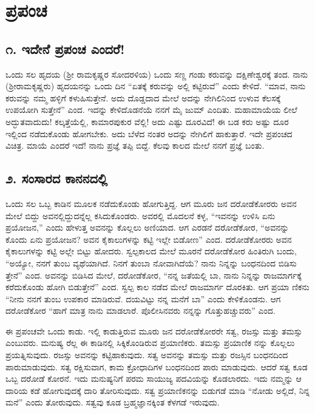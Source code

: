 
\chapter{ಪ್ರಪಂಚ}

\section{\num{೧.} ಇದೇನೆ ಪ್ರಪಂಚ ಎಂದರೆ!}

ಒಂದು ಸಲ ಹೃದಯ (ಶ್ರೀ ರಾಮಕೃಷ್ಣರ ಸೋದರಳಿಯ) ಒಂದು ಸಣ್ಣ ಗಂಡು ಕರುವನ್ನು ದಕ್ಷಿಣೇಶ್ವರಕ್ಕೆ ತಂದ. ನಾನು (ಶ್ರೀರಾಮಕೃಷ್ಣರು) ಹೃದಯನನ್ನು ಒಂದು ದಿನ “ಏತಕ್ಕೆ ಕರುವನ್ನು ಅಲ್ಲಿ ಕಟ್ಟಿರುವೆ” ಎಂದು ಕೇಳಿದೆ. “ಮಾವ, ನಾನು ಕರುವನ್ನು ನಮ್ಮ ಹಳ್ಳಿಗೆ ಕಳುಹಿಸುತ್ತೇನೆ. ಅದು ದೊಡ್ಡದಾದ ಮೇಲೆ ಅದನ್ನು ನೇಗಿಲಿನಿಂದ ಉಳುವ ಕೆಲಸಕ್ಕೆ ಉಪಯೋಗಿ ಸುತ್ತೇನೆ” ಎಂದ. ಇದನ್ನು ಕೇಳಿದೊಡನೆಯೆ ನನಗೆ ಮೈ ಜುಮ್ ಎಂದಿತು. ಮಹಾಮಾಯೆಯ ಲೀಲೆ ಅದ್ಭುತವಾದುದು! ಕಲ್ಕತ್ತೆಯೆಲ್ಲಿ, ಕಾಮಾರಪುಕುರ ವೆಲ್ಲಿ! ಅದು ಎಷ್ಟು ದೂರವಿದೆ! ಈ ಬಡ ಕರು ಅಷ್ಟು ದೂರ ಇಲ್ಲಿಂದ ನಡೆದುಕೊಂಡು ಹೋಗಬೇಕು. ಅದು ಬೆಳೆದ ನಂತರ ಅದನ್ನು ನೇಗಿಲಿಗೆ ಹಾಕುತ್ತಾರೆ. ಇದೇ ಪ್ರಪಂಚದ ವಿಚಿತ್ರ. ಮಾಯೆ ಎಂದರೆ ಇದೆ! ನಾನು ಪ್ರಜ್ಞೆ ತಪ್ಪಿ ಬಿದ್ದೆ. ಕೆಲವು ಕಾಲದ ಮೇಲೆ ನನಗೆ ಪ್ರಜ್ಞೆ ಬಂತು.


\section{\num{೨.} ಸಂಸಾರದ ಕಾನನದಲ್ಲಿ}

ಒಂದು ಸಲ ಒಬ್ಬ ಕಾಡಿನ ಮೂಲಕ ನಡೆದುಕೊಂಡು ಹೋಗುತ್ತಿದ್ದ. ಆಗ ಮೂರು ಜನ ದರೋಡೆಕೋರರು ಅವನ ಮೇಲೆ ಬಿದ್ದು ಅವನಲ್ಲಿದ್ದುದನ್ನೆಲ್ಲ ಕಸಿದುಕೊಂಡರು. ಅವರಲ್ಲಿ ಮೊದಲನೆ ಕಳ್ಳ, “ಇವನನ್ನು ಉಳಿಸಿ ಏನು ಪ್ರಯೋಜನ,” ಎಂದು ಹೇಳುತ್ತ ಅವನನ್ನು ಕೊಲ್ಲಲು ಅಣಿಯಾದ. ಆಗ ಎರಡನೆ ದರೋಡೆಕೋರ, “ಅವನನ್ನು ಕೊಂದು ಏನು ಪ್ರಯೋಜನ? ಅವನ ಕೈಕಾಲುಗಳನ್ನು ಕಟ್ಟಿ ಇಲ್ಲೇ ಬಿಡೋಣ” ಎಂದ. ದರೋಡೆಕೋರರು ಅವನ ಕೈಕಾಲುಗಳನ್ನು ಕಟ್ಟಿ ಅಲ್ಲೇ ಬಿಟ್ಟು ಹೋದರು. ಸ್ವಲ್ಪಕಾಲದ ಮೇಲೆ ಮೂರನೆ ದರೋಡೆಕೋರ ಹಿಂತಿರುಗಿ ಬಂದು, “ಅಯ್ಯೋ, ನನಗೆ ತುಂಬ ವ್ಯಥೆಯಾಗಿದೆ. ನಿನಗೆ ತುಂಬಾ ನೋವಾಗಿದೆಯೆ? ನಾನು ನಿನ್ನನ್ನು ಬಂಧನದಿಂದ ಬಿಡಿಸು ತ್ತೇನೆ” ಎಂದ. ಅವನನ್ನು ಬಿಡಿಸಿದ ಮೇಲೆ, ದರೋಡೆಕೋರ, “ನನ್ನ ಜತೆಯಲ್ಲಿ ಬಾ, ನಾನು ನಿನ್ನನ್ನು ರಾಜಮಾರ್ಗಕ್ಕೆ ಕರೆದುಕೊಂಡು ಹೋಗಿ ಬಿಡುತ್ತೇನೆ” ಎಂದ. ಸ್ವಲ್ಪ ಕಾಲ ನಡೆದ ಮೇಲೆ ರಾಜಮಾರ್ಗ ದೊರಕಿತು. ಆಗ ಪ್ರಯಾ ಣಿಕನು “ನೀನು ನನಗೆ ತುಂಬ ಉಪಕಾರ ಮಾಡಿರುವೆ. ದಯವಿಟ್ಟು ನನ್ನ ಮನೆಗೆ ಬಾ” ಎಂದು ಕೇಳಿಕೊಂಡನು. ಆಗ ದರೋಡೆಕೋರ “ಹಾಗೆ ಮಾತ್ರ ನಾನು ಮಾಡಲಾರೆ. ಪೊಲೀಸಿನವರು ನನ್ನನ್ನು ಗೊತ್ತುಹಚ್ಚುವರು” ಎಂದ.

ಈ ಪ್ರಪಂಚವೇ ಒಂದು ಕಾಡು. ಇಲ್ಲಿ ಕಾಡುತ್ತಿರುವ ಮೂರು ಜನ ದರೋಡೆಕೋರರೇ ಸತ್ವ, ರಜಸ್ಸು ಮತ್ತು ತಮಸ್ಸು ಎಂಬುವರು. ಮನುಷ್ಯ ರೆಲ್ಲ ಈ ಕಾಡಿನಲ್ಲಿ ಸಿಕ್ಕಿಕೊಂಡಿರುವ ಪ್ರಯಾಣಿಕರು. ತಮಸ್ಸು ಪ್ರಯಾಣಿಕ ನನ್ನು ಕೊಲ್ಲಲು ಪ್ರಯತ್ನಿಸುವುದು. ರಜಸ್ಸು ಅವನನ್ನು ಕಟ್ಟಿಹಾಕುವುದು. ಸತ್ವ ಅವನನ್ನು ತಮಸ್ಸು ಮತ್ತು ರಜಸ್ಸಿನ ಬಂಧನದಿಂದ ಪಾರುಮಾಡುವುದು. ಸತ್ವ ರಕ್ಷಿಸುವಾಗ, ಕಾಮ ಕ್ರೋಧಾದಿಗಳ ಬಂಧನದಿಂದ ಪಾರು ಮಾಡುವುದು. ಆದರೆ ಸತ್ವ ಕೂಡ ಒಬ್ಬ ದರೋಡೆ ಕೋರನೆ. ಇದು ಮನುಷ್ಯನಿಗೆ ಪರಮ ಸಾಯುಜ್ಯ ಪದವಿಯನ್ನು ಕೊಡಲಾರದು. ಇದು ನಮ್ಮನ್ನು ಆ ದಾರಿಯ ಕಡೆ ಹೋಗುವುದಕ್ಕೆ ದಾರಿ ತೋರಿಸುವುದು. ಸತ್ವ ಪ್ರಯಾಣಿಕನನ್ನು ಬಿಡುಗಡೆ ಮಾಡಿ “ನೋಡು ಅಲ್ಲಿದೆ, ನಿನ್ನ ಮನೆ” ಎಂದು ತೋರುವುದು. ಸತ್ವವು ಕೂಡ ಬ್ರಹ್ಮಜ್ಞಾನಕ್ಕಿಂತ ಕೆಳಗಡೆ ಇರುವುದು.


